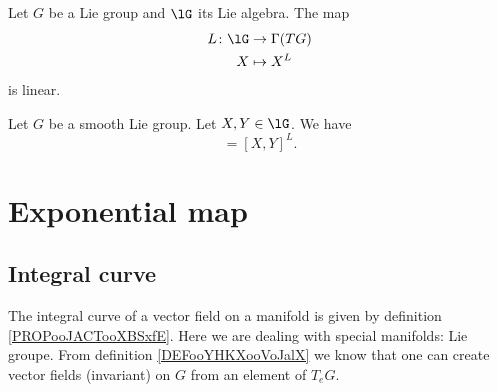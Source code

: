 \begin{proposition}      \label{PROPooWWXKooWEBpMf}
	Let \( G\) be a Lie group and \( \lG\) its Lie algebra. The map
	\begin{equation}
		\begin{aligned}
			L\colon \lG & \to \Gamma(TG) \\
			X           & \mapsto X^L
		\end{aligned}
	\end{equation}
	is linear.
\end{proposition}


\begin{proposition}	\label{PROPooPYVRooFtRGaj}
	Let \( G\) be a smooth Lie group. Let \( X,Y\in \lG\). We have
	\begin{equation}
		[X^L,Y^L]=[X,Y]^L.
	\end{equation}
\end{proposition}


\section{Exponential map}

\subsection{Integral curve}

The integral curve of a vector field on a manifold is given by definition \ref{PROPooJACTooXBSxfE}. Here we are dealing with special manifolds: Lie groupe. From definition \ref{DEFooYHKXooVoJalX} we know that one can create vector fields (invariant) on \( G\) from an element of \( T_eG\).

